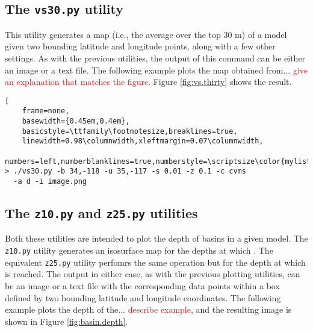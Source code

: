 \subsection{The \textup{\texttt{vs30.py}} utility}

This utility generates a \vsthirty{} map (i.e., the average \vs{} over the top 30 m) of a model given two bounding latitude and longitude points, along with a few other settings. As with the previous utilities, the output of this command can be either an image or a text file. The following example plots the \vsthirty map obtained from... \textcolor{red}{give an explanation that matches the figure}. Figure \ref{fig:vs.thirty} shows the result.

\begin{lstlisting}[
	frame=none,
	basewidth={0.45em,0.4em},
	basicstyle=\ttfamily\footnotesize,breaklines=true,
	linewidth=0.98\columnwidth,xleftmargin=0.07\columnwidth,
	numbers=left,numberblanklines=true,numberstyle=\scriptsize\color{mylistingnclr}]
> ./vs30.py -b 34,-118 -u 35,-117 -s 0.01 -z 0.1 -c cvms 
  -a d -i image.png
\end{lstlisting}

\subsection{The \textup{\texttt{z10.py}} and \textup{\texttt{z25.py}} utilities}

Both these utilities are intended to plot the depth of basins in a given model. The \texttt{z10.py} utility generates an isosurface map for the depths at which . The equivalent \texttt{z25.py} utility perfomrs the same operation but for the depth at which  is reached. The output in either case, as with the previous plotting utilities, can be an image or a text file with the corresponding data points within a box defined by two bounding latitude and longitude coordinates. The following example plots the depth of the... \textcolor{red}{describe example}, and the resulting image is shown in Figure \ref{fig:basin.depth}.

